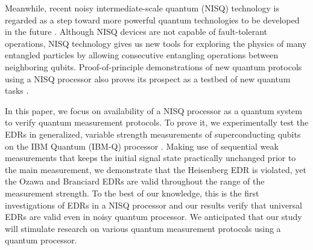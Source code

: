 \documentclass[%
reprint,
superscriptaddress,
 amsmath,amssymb,
 aps,
pra,
]{revtex4-2}
\begin{document}
Meanwhile, recent noisy intermediate-scale quantum (NISQ) technology is regarded as a step toward more powerful quantum technologies to be developed in the future \cite{Preskill2018quantumcomputingin}. 
Although NISQ devices are not capable of fault-tolerant operations, NISQ technology gives us new tools for exploring the physics of many entangled particles by allowing consecutive entangling operations between neighboring qubits. 
Proof-of-principle demonstrations of new quantum protocols using a NISQ processor also proves its prospect as a testbed of new quantum tasks \cite{PRXQuantum.3.040333, 10.1364/cleo_qels.2022.ff2i.1, tan2023extending}.

In this paper, we focus on availability of a NISQ processor as a quantum system to verify quantum measurement protocols. 
To prove it, we experimentally test the EDRs in generalized, variable strength measurements of superconducting qubits on the IBM Quantum (IBM-Q) processor \cite{ibm2021}. 
Making use of sequential weak measurements that keeps the initial signal state practically unchanged prior to the main measurement, we demonstrate that the Heisenberg EDR is violated, yet the Ozawa and Branciard EDRs are valid throughout the range of the measurement strength.
To the best of our knowledge, this is the first investigations of EDRs in a NISQ processor and our results verify that universal EDRs are valid even in noisy quantum processor. We anticipated that our study will stimulate research on various quantum measurement protocols using a quantum processor.

\end{document}
